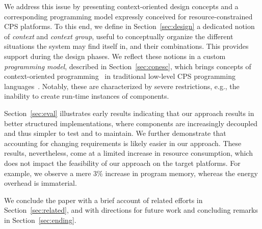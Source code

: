 We address this issue by presenting context-oriented design concepts
and a corresponding programming model expressly conceived for
resource-constrained CPS platforms. To this end, we define in
Section~\ref{sec:design} a dedicated notion of \emph{context} and
\emph{context group}, useful to conceptually organize the different
situations the system may find itself in, and their combinations. This
provides support during the design phases. We reflect these notions in
a custom \emph{programming model}, described in
Section~\ref{sec:conesc}, which brings concepts of context-oriented
programming~\cite{Hirschfeld08} in traditional low-level CPS programming
languages~\cite{gay03nesc}. Notably, these are characterized by severe restrictions,
e.g., the inability to create run-time instances of components.

Section~\ref{sec:eval} illustrates early results indicating that our
approach results in better structured implementations, where
components are increasingly decoupled and thus simpler to test and to
maintain. We further demonstrate that accounting for changing
requirements is likely easier in our approach. These results,
nevertheless, come at a limited increase in resource consumption,
which does not impact the feasibility of our approach on the target
platforms. For example, we observe a mere 3\% increase in program
memory, whereas the energy overhead is immaterial.

We conclude the paper with a brief account of related efforts in
Section~\ref{sec:related}, and with directions for future work and
concluding remarks in Section~\ref{sec:ending}.







